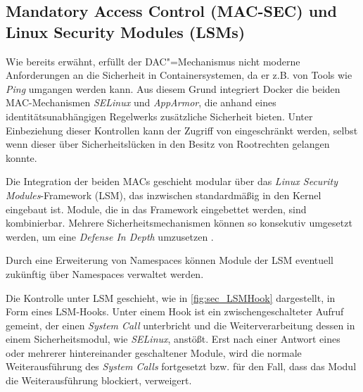 \documentclass[../main.tex]{subfiles}
\begin{document}



    \subsection{Mandatory Access Control (\acrshort{MAC-SEC}) und Linux Security Modules (\acrshort{LSM}s)}
		\label{lsm}
			Wie bereits erwähnt, erfüllt der DAC"=Mechanismus nicht moderne Anforderungen an die Sicherheit in Containersystemen, da er z.B. von Tools wie \emph{Ping} umgangen werden kann. Aus diesem Grund integriert Docker die beiden MAC-Mechanismen \emph{\acrshort{SELinux}} und \emph{\acrshort{AppArmor}}, die anhand eines identitätsunabhängigen Regelwerks zusätzliche Sicherheit bieten. Unter Einbeziehung dieser Kontrollen kann der Zugriff von \cbroken{} eingeschränkt werden, selbst wenn dieser über Sicherheitslücken in den Besitz von Rootrechten gelangen konnte.

			Die Integration der beiden MACs geschieht modular über das \emph{Linux Security Modules}-Framework (\acrshort{LSM}), das inzwischen standardmäßig in den Kernel eingebaut ist. Module, die in das Framework eingebettet werden, sind kombinierbar. Mehrere Sicherheitsmechanismen können so konsekutiv umgesetzt werden, um eine \emph{Defense In Depth} umzusetzen \cite[S.3]{LSMFramework}.

			Durch eine Erweiterung von Namespaces können Module der LSM eventuell zukünftig über Namespaces verwaltet werden.

			Die Kontrolle unter LSM geschieht, wie in \fig \ref{fig:sec_LSMHook} dargestellt, in Form eines LSM-Hooks. Unter einem Hook ist ein zwischengeschalteter Aufruf gemeint, der einen \emph{System Call} unterbricht und die Weiterverarbeitung dessen in einem Sicherheitsmodul, wie \emph{SELinux}, anstößt. Erst nach einer Antwort eines oder mehrerer hintereinander geschaltener Module, wird die normale Weiterausführung des \emph{System Calls} fortgesetzt bzw. für den Fall, dass das Modul die Weiterausführung blockiert, verweigert.
\end{document}
